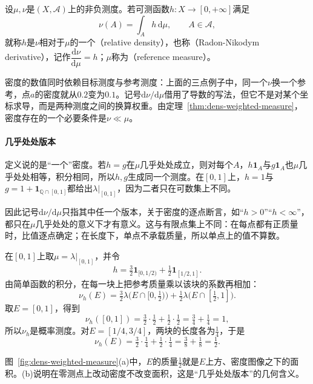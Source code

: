 \begin{definition}[相对密度]
\label{def:dens-relative-density}
设$\mu,\nu$是$(X,\mathcal A)$上的非负测度。若可测函数$h:X\to[0,+\infty]$满足
\begin{equation}
\nu(A)=\int_Ah\,\mathrm d\mu ,\qquad A\in\mathcal A ,
\label{eq:dens-definition}
\end{equation}
就称$h$是$\nu$相对于$\mu$的一个（relative density），也称（Radon-Nikodym derivative），记作$\dfrac{\mathrm d\nu}{\mathrm d\mu}=h$；$\mu$称为（reference measure）。
\end{definition}

密度的数值同时依赖目标测度与参考测度：上面的三点例子中，同一个$\nu$换一个参考，点$a$的密度就从$0.2$变为$0.1$。记号$\mathrm d\nu/\mathrm d\mu$借用了导数的写法，但它不是对某个坐标求导，而是两种测度之间的换算权重。由定理~\ref{thm:dens-weighted-measure}，密度存在的一个必要条件是$\nu\ll\mu$。

\paragraph{几乎处处版本}
定义说的是“一个”密度。若$h=g$在$\mu$几乎处处成立，则对每个$A$，$h\mathbf 1_A$与$g\mathbf 1_A$也$\mu$几乎处处相等，积分相同，所以$h,g$生成同一个测度。在$[0,1]$上，$h=1$与$g=1+\mathbf 1_{\mathbb Q\cap[0,1]}$都给出$\lambda|_{[0,1]}$，因为二者只在可数集上不同。

因此记号$\mathrm d\nu/\mathrm d\mu$只指其中任一个版本，关于密度的逐点断言，如“$h>0$”“$h<\infty$”，都只在$\mu$几乎处处的意义下才有意义。这与有限点集上不同：在每点都有正质量时，比值逐点确定；在长度下，单点不承载质量，所以单点上的值不算数。

\begin{example}[分段常值密度]
\label{ex:dens-piecewise}
在$[0,1]$上取$\mu=\lambda|_{[0,1]}$，并令
\[
h=\tfrac32\mathbf 1_{[0,1/2)}+\tfrac12\mathbf 1_{[1/2,1]} .
\]
由简单函数的积分，在每一块上把参考质量乘以该块的系数再相加：
\[
\nu_h(E)=\tfrac32\lambda\bigl(E\cap[0,\tfrac12)\bigr)+\tfrac12\lambda\bigl(E\cap[\tfrac12,1]\bigr).
\]
取$E=[0,1]$，得到
\[
\nu_h([0,1])=\tfrac32\cdot\tfrac12+\tfrac12\cdot\tfrac12=\tfrac34+\tfrac14=1 ,
\]
所以$\nu_h$是概率测度。对$E=[1/4,3/4]$，两块的长度各为$\tfrac14$，于是
\[
\nu_h(E)=\tfrac32\cdot\tfrac14+\tfrac12\cdot\tfrac14=\tfrac38+\tfrac18=\tfrac12 .
\]
\end{example}

图~\ref{fig:dens-weighted-measure}(a)中，$E$的质量$\tfrac12$就是$E$上方、密度图像之下的面积。(b)说明在零测点上改动密度不改变面积，这是“几乎处处版本”的几何含义。

